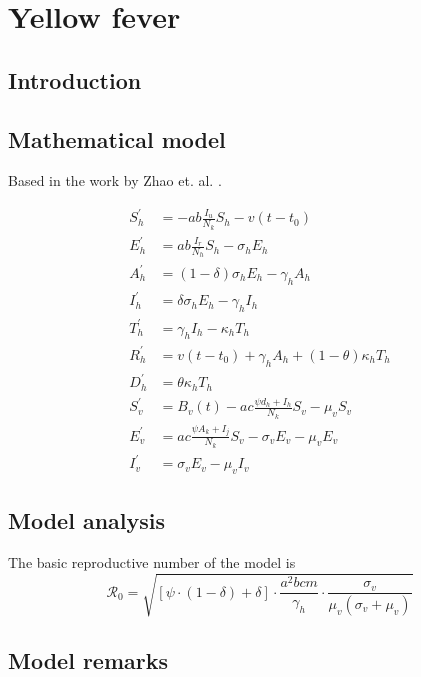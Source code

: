 \documentclass{book}\usepackage[]{graphicx}\usepackage[]{color}
\begin{document}
\section{Yellow fever}

\subsection*{Introduction}

\subsection*{Mathematical model}
Based in the work by Zhao et. al. \cite{zhao2018modelling}.

\begin{equation}
\begin{split}
S_{h}^{\prime} &=-a b \frac{I_{u}}{N_{k}} S_{h}-v\left(t-t_{0}\right) \\
E_{h}^{\prime} &=a b \frac{I_{r}}{N_{h}} S_{h}-\sigma_{h} E_{h} \\
A_{h}^{\prime} &=(1-\delta) \sigma_{h} E_{h}-\gamma_{h} A_{h} \\
I_{h}^{\prime} &=\delta \sigma_{h} E_{h}-\gamma_{h} I_{h} \\
T_{h}^{\prime} &=\gamma_{h} I_{h}-\kappa_{h} T_{h} \\
R_{h}^{\prime} &=v\left(t-t_{0}\right)+\gamma_{h} A_{h}+(1-\theta) \kappa_{h} T_{h} \\
D_{h}^{\prime} &=\theta \kappa_{h} T_{h} \\[2ex]
S_{v}^{\prime} &=B_{v}(t)-a c \frac{\psi d_{h}+I_{h}}{N_{k}} S_{v}-\mu_{v} S_{v} \\
E_{v}^{\prime} &=a c \frac{\psi A_{k}+I_{j}}{N_{k}} S_{v}-\sigma_{v} E_{v}-\mu_{v} E_{v} \\
I_{v}^{\prime} &=\sigma_{v} E_{v}-\mu_{v} I_{v}
\end{split}
\end{equation}

\subsection*{Model analysis}
The basic reproductive number of the model is 
\begin{equation}
\mathcal{R}_{0}=\sqrt{[\psi \cdot(1-\delta)+\delta] \cdot \frac{a^{2} b c m}{\gamma_{h}} \cdot \frac{\sigma_{v}}{\mu_{v}\left(\sigma_{v}+\mu_{v}\right)}}
\end{equation}

\subsection*{Model remarks}
\end{document}
